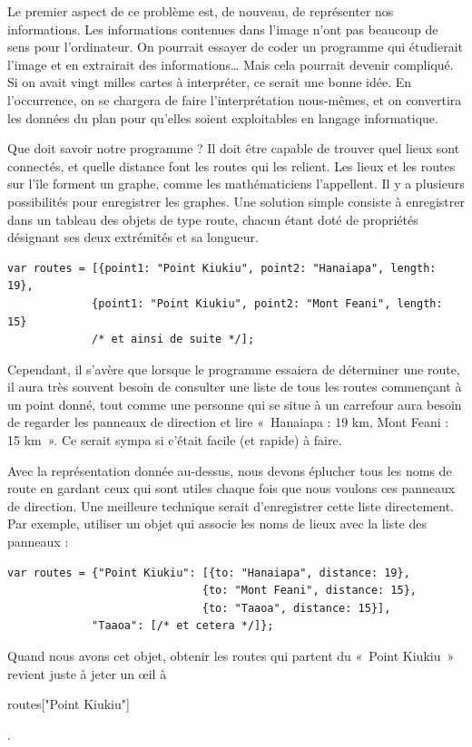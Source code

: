 \documentclass{FramateX}
\renewcommand{\texttt}[1]{\begin{sffamily}{#1}\end{sffamily}}
\begin{document}
Le premier aspect de ce problème est, de nouveau, de représenter nos
informations. Les informations contenues dans l'image n'ont pas beaucoup
de sens pour l'ordinateur. On pourrait essayer de coder un programme qui
étudierait l'image et en extrairait des informations\ldots{} Mais cela
pourrait devenir compliqué. Si on avait vingt milles cartes à
interpréter, ce serait une bonne idée. En l'occurrence, on se chargera
de faire l'interprétation nous-mêmes, et on convertira les données du
plan pour qu'elles soient exploitables en langage informatique.

Que doit savoir notre programme ? Il doit être capable de trouver quel
lieux sont connectés, et quelle distance font les routes qui les
relient. Les lieux et les routes sur l'île forment un graphe, comme les
mathématiciens l'appellent. Il y a plusieurs possibilités pour
enregistrer les graphes. Une solution simple consiste à enregistrer dans
un tableau des objets de type route, chacun étant doté de propriétés
désignant ses deux extrémités et sa longueur.

\begin{lstlisting}
var routes = [{point1: "Point Kiukiu", point2: "Hanaiapa", length: 19},
             {point1: "Point Kiukiu", point2: "Mont Feani", length: 15}
             /* et ainsi de suite */];
\end{lstlisting}
Cependant, il s'avère que lorsque le programme essaiera de déterminer
une route, il aura très souvent besoin de consulter une liste de tous
les routes commençant à un point donné, tout comme une personne qui se
situe à un carrefour aura besoin de regarder les panneaux de direction
et lire «~Hanaiapa : 19 km, Mont Feani : 15 km~». Ce serait sympa si
c'était facile (et rapide) à faire.

Avec la représentation donnée au-dessus, nous devons éplucher tous les
noms de route en gardant ceux qui sont utiles chaque fois que nous
voulons ces panneaux de direction. Une meilleure technique serait
d'enregistrer cette liste directement. Par exemple, utiliser un objet
qui associe les noms de lieux avec la liste des panneaux :

\begin{lstlisting}
var routes = {"Point Kiukiu": [{to: "Hanaiapa", distance: 19},
                              {to: "Mont Feani", distance: 15},
                              {to: "Taaoa", distance: 15}],
             "Taaoa": [/* et cetera */]};
\end{lstlisting}
Quand nous avons cet objet, obtenir les routes qui partent du «~Point
Kiukiu~» revient juste à jeter un œil à
\texttt{routes{[}"Point Kiukiu"{]}}.
\end{document}
